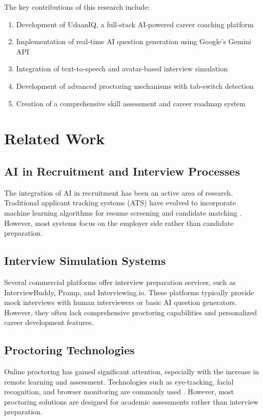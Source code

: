 \documentclass[12pt, conference]{IEEEtran}
\begin{document}
The key contributions of this research include:
\begin{enumerate}
    \item Development of UdaanIQ, a full-stack AI-powered career coaching platform
    \item Implementation of real-time AI question generation using Google's Gemini API
    \item Integration of text-to-speech and avatar-based interview simulation
    \item Development of advanced proctoring mechanisms with tab-switch detection
    \item Creation of a comprehensive skill assessment and career roadmap system
\end{enumerate}

\section{Related Work}

\subsection{AI in Recruitment and Interview Processes}

The integration of AI in recruitment has been an active area of research. Traditional applicant tracking systems (ATS) have evolved to incorporate machine learning algorithms for resume screening and candidate matching \cite{smith2023ai}. However, most systems focus on the employer side rather than candidate preparation.

\subsection{Interview Simulation Systems}

Several commercial platforms offer interview preparation services, such as InterviewBuddy, Pramp, and Interviewing.io. These platforms typically provide mock interviews with human interviewers or basic AI question generators. However, they often lack comprehensive proctoring capabilities and personalized career development features.

\subsection{Proctoring Technologies}

Online proctoring has gained significant attention, especially with the increase in remote learning and assessment. Technologies such as eye-tracking, facial recognition, and browser monitoring are commonly used \cite{brown2022online}. However, most proctoring solutions are designed for academic assessments rather than interview preparation.
\end{document}
